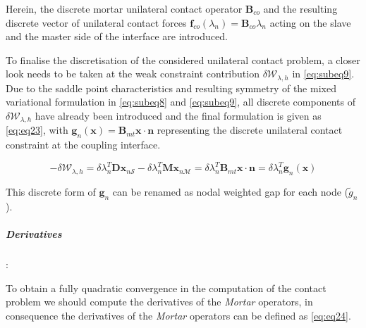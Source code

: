\documentclass[a4paper,10pt]{article} %
\begin{document}
Herein, the discrete mortar unilateral contact operator $\mathbf{B}_{co}$ and the resulting discrete vector of unilateral contact forces $\mathbf{f}_{co} (\lambda_n) = \mathbf{B}_{co}\lambda_n$ acting on the slave and the master side of the interface are introduced.

To finalise the discretisation of the considered unilateral contact problem, a closer look needs to
be taken at the weak constraint contribution $\delta \mathcal{W}_{\lambda,h} $ in \eqref{eq:subeq9}. Due to the saddle point characteristics and resulting symmetry of the mixed variational formulation in \eqref{eq:subeq8}  and \eqref{eq:subeq9}, all discrete components of $\delta \mathcal{W}_{\lambda,h}$ have already been introduced and the final formulation is given as \eqref{eq:eq23}, with $\mathbf{g}_{n}(\mathbf{x}) = \mathbf{B}_{mt} \mathbf{x} \cdot \mathbf{n}$ representing the discrete unilateral contact constraint at the coupling interface.

\begin{equation}\label{eq:eq23}
 -\delta \mathcal{W}_{\lambda,h} = \delta \lambda_n^T\mathbf{D}\mathbf{x}_{n\mathcal{S}} - \delta \lambda_n^T\mathbf{M}\mathbf{x}_{n\mathcal{M}}= \delta \lambda_n^T \mathbf{B}_{mt} \mathbf{x} \cdot \mathbf{n} = \delta \lambda_n^T \mathbf{g}_{n}(\mathbf{x})
\end{equation}

This discrete form of $\mathbf{g}_{n}$ can be renamed as nodal weighted gap for each node ($\tilde{g}_n$).

\subparagraph{Derivatives}:

To obtain a fully quadratic convergence in the computation of the contact problem we should compute the derivatives of the \textit{Mortar} operators, in consequence the derivatives of the \textit{Mortar} operators can be defined as \eqref{eq:eq24}.
\end{document}
